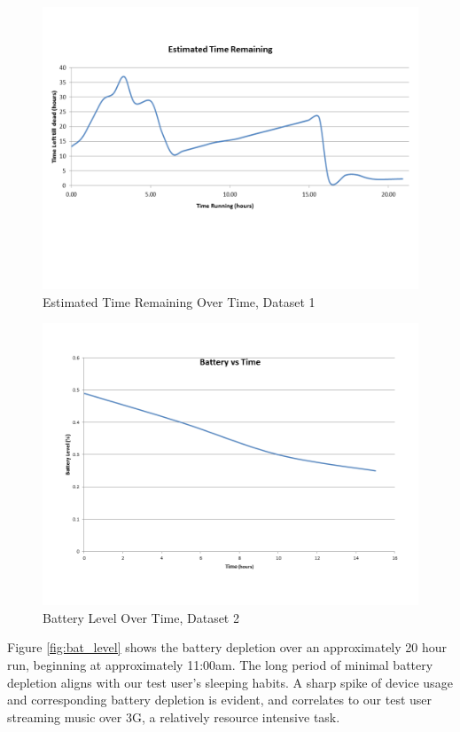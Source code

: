\begin{figure}[h]
	\begin{center}
		\includegraphics[scale=0.5]{figs/est_time_remaining.png}
		\caption{Estimated Time Remaining Over Time, Dataset 1}
		\label{fig:est_remaining}
\end{center}
\end{figure}
\begin{figure}[h]
	\begin{center}
		\includegraphics[scale=0.5]{figs/bat_vs_time_short.png}
		\caption{Battery Level Over Time, Dataset 2}
		\label{fig:bat_vs_time_short}
\end{center}
\end{figure}
Figure \ref{fig:bat_level} shows the battery depletion over an approximately 20 hour run, beginning at approximately 11:00am. 
The long period of minimal battery depletion aligns with our test user's sleeping habits.
A sharp spike of device usage and corresponding battery depletion is evident, and correlates to our test user streaming music over 3G, a relatively resource intensive task.


